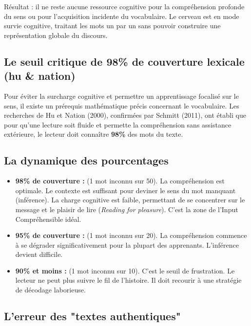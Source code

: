 Résultat : il ne reste aucune ressource cognitive pour la compréhension profonde du sens ou pour
l'acquisition incidente du vocabulaire. Le cerveau est en mode \og survie cognitive\fg{}, traitant
les mots un par un sans pouvoir construire une représentation globale du
discours.\cite{II-3-3-ref39}



\subsection{Le seuil critique de 98\% de couverture lexicale (hu \& nation)}

Pour éviter la surcharge cognitive et permettre un apprentissage focalisé sur le sens, il existe un
prérequis mathématique précis concernant le vocabulaire. Les recherches de Hu et Nation (2000),
confirmées par Schmitt (2011), ont établi que pour qu'une lecture soit fluide et permette la
compréhension sans assistance extérieure, le lecteur doit connaître \textbf{98\%} des mots du
texte.\cite{II-3-3-ref43}



\subsection{La dynamique des pourcentages}

\begin{itemize}\item \textbf{98\% de couverture :} (1 mot inconnu sur 50). La compréhension est optimale. Le contexte est suffisant pour deviner le sens du mot manquant (inférence). La charge cognitive est faible, permettant de se concentrer sur le message et le plaisir de lire (\textit{Reading for pleasure}). C'est la zone de l'Input Compréhensible idéal.\cite{II-3-3-ref46}\item \textbf{95\% de couverture :} (1 mot inconnu sur 20). La compréhension commence à se dégrader significativement pour la plupart des apprenants. L'inférence devient difficile.\cite{II-3-3-ref41}\item \textbf{90\% et moins :} (1 mot inconnu sur 10). C'est le seuil de frustration. Le lecteur ne peut plus suivre le fil de l'histoire. Il doit recourir à une stratégie de décodage laborieuse.\end{itemize}

\subsection{L'erreur des "textes authentiques"}

